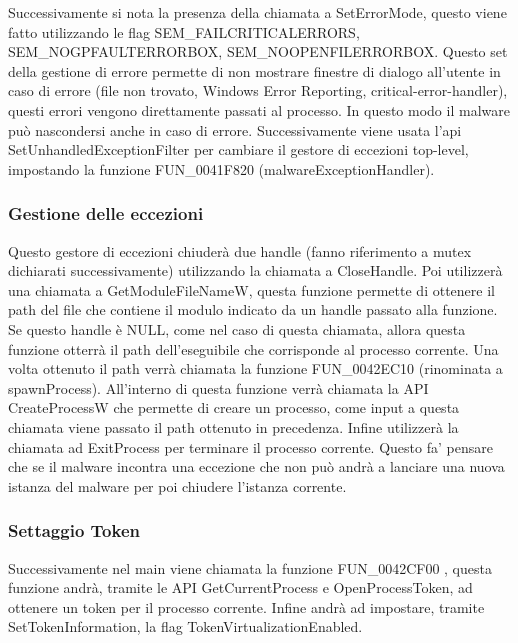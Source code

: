 \documentclass[a4paper,12pt]{article}
\begin{document}
Successivamente si nota la presenza della chiamata a SetErrorMode, questo viene fatto utilizzando le flag SEM\_FAILCRITICALERRORS,\\ SEM\_NOGPFAULTERRORBOX, SEM\_NOOPENFILERRORBOX. Questo set della gestione di errore permette di non mostrare finestre di dialogo all'utente in caso di errore (file non trovato, Windows Error Reporting, critical-error-handler), questi errori vengono direttamente passati al processo. In questo modo il malware può nascondersi anche in caso di errore. Successivamente viene usata l'api SetUnhandledExceptionFilter per cambiare il gestore di eccezioni top-level, impostando la funzione FUN\_0041F820 (malwareExceptionHandler). 

\subsubsection{Gestione delle eccezioni}
Questo gestore di eccezioni chiuderà due handle (fanno riferimento a mutex dichiarati successivamente) utilizzando la chiamata a CloseHandle. Poi utilizzerà una chiamata a GetModuleFileNameW, questa funzione permette di ottenere il path del file che contiene il modulo indicato da un handle passato alla funzione. Se questo handle è NULL, come nel caso di questa chiamata, allora questa funzione otterrà il path dell'eseguibile che corrisponde al processo corrente. Una volta ottenuto il path verrà chiamata la funzione FUN\_0042EC10 (rinominata a spawnProcess). All'interno di questa funzione verrà chiamata la API CreateProcessW che permette di creare un processo, come input a questa chiamata viene passato il path ottenuto in precedenza. Infine utilizzerà la chiamata ad ExitProcess per terminare il processo corrente. Questo fa' pensare che se il malware incontra una eccezione che non può andrà a lanciare una nuova istanza del malware per poi chiudere l'istanza corrente.

\subsubsection{Settaggio Token}
Successivamente nel main viene chiamata la funzione FUN\_0042CF00 , questa funzione andrà, tramite le API GetCurrentProcess e OpenProcessToken, ad ottenere un token per il processo corrente. Infine andrà ad impostare, tramite SetTokenInformation, la flag TokenVirtualizationEnabled.
\end{document}
